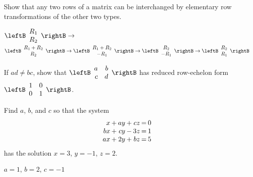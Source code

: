 \begin{multicols}{2}
\begin{supex}
Show that any two rows of a matrix can be interchanged by elementary row transformations of the other two types.

\begin{supsol}
$\leftB \begin{array}{c}
	R_1 \\
	R_2
\end{array} \rightB
\to $ \\ $\leftB \begin{array}{c}
	R_1 + R_2 \\
	R_2
\end{array} \rightB
\to
\leftB \begin{array}{c}
	R_1 + R_2 \\
	-R_1
\end{array} \rightB
\to
\leftB \begin{array}{c}
	R_2 \\
	-R_1
\end{array} \rightB
\to
\leftB \begin{array}{c}
	R_2 \\
	R_1
\end{array} \rightB$
\end{supsol}
\end{supex}

\begin{supex}
If $ad \neq bc$, show that $\leftB \begin{array}{rr}
a & b \\
c & d
\end{array} \rightB$ has reduced row-echelon form $
 \leftB \begin{array}{rrr}
 1 & 0 \\
 0 & 1
 \end{array} \rightB $.
\end{supex}

\begin{supex}
Find $a$, $b$, and $c$ so that the system
\begin{equation*}
\arraycolsep=1pt
\begin{array}{rlrlrcr}
	 x & + &  ay & + &  cz & = &  0 \\
	bx & + &  cy & - &  3z & = &  1 \\
	ax & + &  2y & + &  bz & = &  5 
\end{array}
\end{equation*}
has the solution $x = 3$, $y = -1$, $z = 2$.

\begin{supsol}
$a = 1$, $b = 2$, $c = -1$
\end{supsol}
\end{supex}


\end{multicols}
